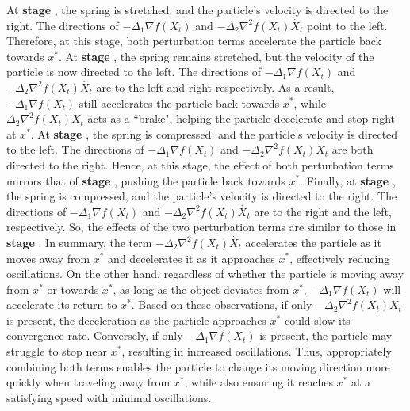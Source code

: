 \documentclass[11pt]{article}
\newcommand{\1}{\mathbf 1}
\numberwithin{equation}{section}
\begin{document}
At \textbf{stage \uppercase\expandafter{}}, the spring is stretched, and the particle's velocity is directed to the right. The directions of $-\Delta_1\nabla f(X_t)$ and $-\Delta_2\nabla^2 f(X_t)\dot{X_t}$ point to the left. Therefore, at this stage, both perturbation terms accelerate the particle back towards $x^*$. At \textbf{stage \uppercase\expandafter{}}, the spring remains stretched, but the velocity of the particle is now directed to the left. The directions of $-\Delta_1\nabla f(X_t)$ and $-\Delta_2\nabla^2 f(X_t)\dot{X_t}$ are to the left and right respectively. As a result, $-\Delta_1\nabla f(X_t)$
still accelerates the particle back towards $x^*$, while $\Delta_2\nabla^2 f(X_t)\dot{X_t}$ acts as a ``brake", helping the particle decelerate and stop right at $x^*$. At \textbf{stage \uppercase\expandafter{}}, the spring is compressed, and the particle's velocity is directed to the left. The directions of $-\Delta_1\nabla f(X_t)$ and $-\Delta_2\nabla^2 f(X_t)\dot{X_t}$ are both directed to the right. Hence, at this stage, the effect of both perturbation terms mirrors that of {\bf stage} \uppercase\expandafter{}, pushing the particle back towards $x^*$. Finally, at \textbf{stage \uppercase\expandafter{}}, the spring is compressed, and the particle's velocity is directed to the right. The directions of $-\Delta_1\nabla f(X_t)$ and $-\Delta_2\nabla^2f(X_t)\dot{X_t}$ are to the right and the left, respectively. So, the effects of the two perturbation terms are similar to those in {\bf stage} \uppercase\expandafter{}.
In summary, the term $-\Delta_2 \nabla^2 f(X_t) \dot{X_t}$ accelerates the particle as it moves away from $x^*$ and decelerates it as it approaches $x^*$, effectively reducing oscillations.
On the other hand, 
regardless of whether the particle is moving away from $x^*$ or towards $x^*$, as long as the object deviates from $x^*$, $-\Delta_1\nabla f(X_t)$ will accelerate its return to $x^*$. Based on these observations, if only $-\Delta_2 \nabla^2 f(X_t) \dot{X_t}$ is present, the deceleration as the particle approaches $x^*$ could slow its convergence rate. Conversely, if only $-\Delta_1 \nabla f(X_t)$ is present, the particle may struggle to stop near $x^*$, resulting in increased oscillations.
Thus, appropriately combining both terms enables the particle to change its moving direction more quickly when traveling away from $x^*$, while also ensuring it reaches $x^*$ at a satisfying speed with minimal oscillations.
\end{document}

